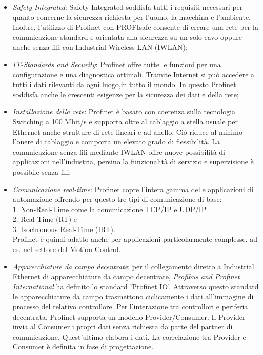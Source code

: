 \documentclass[12pt, a4paper, oneside]{book}
\begin{document}
\begin{itemize}
	\item \textit{Safety Integrated}: Safety Integrated soddisfa tutti i requisiti	necessari per quanto concerne la sicurezza richiesta per l’uomo, la macchina e l’ambiente. Inoltre, l’utilizzo di Profinet con PROFIsafe consente di creare una rete per la comunicazione standard e orientata alla sicurezza su un solo cavo oppure anche senza fili con Industrial Wireless LAN (IWLAN);
	\item \textit{IT-Standards and Security}: Profinet offre tutte le funzioni per una configurazione e una diagnostica ottimali. Tramite Internet si può accedere a tutti i dati rilevanti da ogni luogo,in tutto il mondo. In questo Profinet soddisfa anche le crescenti esigenze per la sicurezza dei dati e della rete;
	\item \textit{Installazione della rete}: Profinet è basato con coerenza sulla tecnologia Switching a 100 Mbit/s e supporta oltre al cablaggio a stella usuale per Ethernet anche strutture di rete lineari e ad anello. Ciò riduce al minimo l’onere di cablaggio e comporta un elevato grado di flessibilità. La comunicazione senza fili mediante IWLAN offre nuove possibilità di applicazioni nell’industria, persino la funzionalità di servizio e supervisione è possibile senza fili;
	\item \textit{Comunicazione real-time}: Profinet copre l’intera gamma delle applicazioni di automazione offrendo per questo tre tipi di comunicazione di base:
	\\1. Non-Real-Time come la comunicazione TCP/IP e UDP/IP
	\\2. Real-Time (RT) e
	\\3. Isochronous Real-Time (IRT). 
	\\Profinet è quindi adatto anche per applicazioni particolarmente complesse, ad es. nel settore del Motion Control.
	\item \textit{Apparecchiature da campo decentrate}: per il collegamento diretto a Industrial Ethernet di apparecchiature da campo decentrate, \textit{Profibus and Profinet International} ha definito lo standard 'Profinet IO'. Attraverso questo standard le apparecchiature da campo trasmettono ciclicamente i dati all’immagine di processo del relativo controllore. Per l’interazione tra controllori e periferia decentrata, Profinet supporta un modello Provider/Consumer. Il Provider invia al Consumer i propri dati senza richiesta da parte del partner di comunicazione. Quest’ultimo elabora i dati. La correlazione tra Provider e Consumer è definita in fase di progettazione.

\end{itemize}
\end{document}
